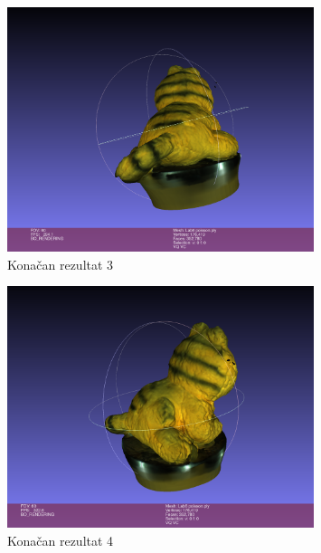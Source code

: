 \documentclass[12pt]{article} %
\begin{document}
		\begin{figure}[H]
			\centering
			\includegraphics[width=0.8\textwidth]{screenshots/24.png}
			\caption{Konačan rezultat 3}
			\label{fig:yourlabel2}
		\end{figure}
		
		
		\begin{figure}[H]
			\centering
			\includegraphics[width=0.8\textwidth]{screenshots/25.png}
			\caption{Konačan rezultat 4}
			\label{fig:yourlabel2}
		\end{figure}

	\eject
	
\end{document}
